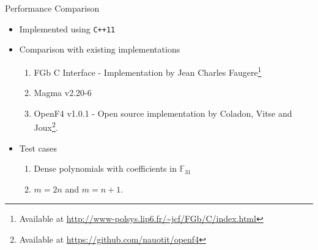 \documentclass{beamer}
\newcommand{\Field}{\mathbb{F}}
\newcommand{\FField}[1]{\Field_{#1}}
\begin{document}
\begin{section}{Performance Comparison}
  \begin{frame}
    \begin{itemize}
    \item<1-> Implemented using \texttt{C++11}
    \item<2-> Comparison with existing implementations
      \begin{enumerate}
      \item FGb C Interface - Implementation by Jean Charles
        Faugere\footnote<2->{Available at
          \url{http://www-polsys.lip6.fr/~jcf/FGb/C/index.html}}
      \item Magma v2.20-6
      \item OpenF4 v1.0.1 - Open source implementation by Coladon,
        Vitse and Joux\footnote<2->{Available at
          \url{https://github.com/nauotit/openf4}}.
      \end{enumerate}

    \item<3-> Test cases
      \begin{enumerate}
      \item Dense polynomials with coefficients in $\FField{31}$
      \item $m = 2n$ and $m = n + 1$.
      \end{enumerate}
      
     
    \end{itemize}
    
  \end{frame}


\end{section}
\end{document}
